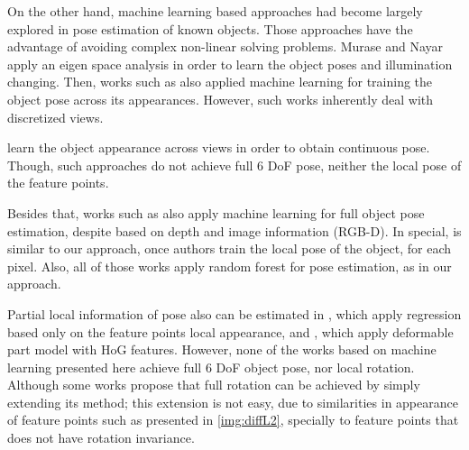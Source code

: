 \documentclass[annual]{acmsiggraph}
\begin{document}
On the other hand, machine learning based approaches had become largely explored in pose estimation of known objects. Those approaches have the advantage of avoiding complex non-linear solving problems. Murase and Nayar  apply an eigen space analysis in order to learn the object poses and illumination changing. Then, works such as \cite{Lepetit:2009,Pepik:2012,Gu:2010} also applied machine learning for training the object pose across its appearances. However, such works inherently deal with discretized views. 

\cite{Torki:2011,He:2014,Hara:2014,Shimizu:2014,Zhen:2015} learn the object appearance across views in order to obtain continuous pose. Though, such approaches do not achieve full 6 DoF pose, neither the local pose of the feature points.%
	
Besides that, works such as \cite{Shotton:2013,Brachmann:2014,Tejani:2014} also apply machine learning for full object pose estimation, despite based on depth and image information (RGB-D). In special, \cite{Tejani:2014} is similar to our approach, once authors train the local pose of the object, for each pixel. Also, all of those works apply random forest for pose estimation, as in our approach.  

Partial local information of pose also can be estimated in \cite{Fenzi:2013}, which apply regression based only on the feature points local appearance, and \cite{Pepik:2012}, which apply deformable part model with HoG features. However, none of the works based on machine learning presented here achieve full 6 DoF object pose, nor local rotation. Although some works propose that full rotation can be achieved by simply extending its method; this extension is not easy, due to similarities in appearance of feature points such as presented in \ref{img:diffL2}, specially to feature points that does not have rotation invariance. 
\end{document}
